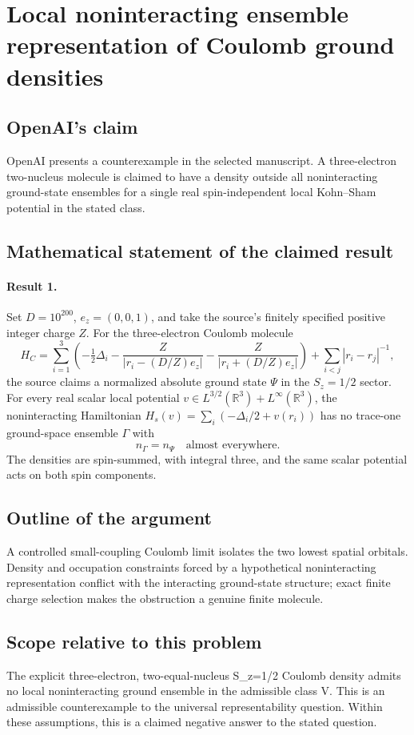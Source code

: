 \documentclass[11pt]{article}
\begin{document}
\section*{Local noninteracting ensemble representation of Coulomb ground densities}

\subsection{OpenAI's claim}
OpenAI presents a counterexample in the selected manuscript. A three-electron two-nucleus molecule is claimed to have a density outside all noninteracting ground-state ensembles for a single real spin-independent local Kohn--Sham potential in the stated class.

\subsection{Mathematical statement of the claimed result}
\paragraph{Result 1.} Set \(D=10^{200}\), \(e_z=(0,0,1)\), and take the source's finitely specified positive integer charge \(Z\). For the three-electron Coulomb molecule
\[
 H_C=\sum_{i=1}^3\left(-\tfrac12\Delta_i-
 \frac Z{|r_i-(D/Z)e_z|}-\frac Z{|r_i+(D/Z)e_z|}\right)
 +\sum_{i<j}|r_i-r_j|^{-1},
\]
the source claims a normalized absolute ground state \(\Psi\) in the \(S_z=1/2\) sector. For every real scalar local potential \(v\in L^{3/2}(\mathbb R^3)+L^\infty(\mathbb R^3)\), the noninteracting Hamiltonian \(H_s(v)=\sum_i(-\Delta_i/2+v(r_i))\) has no trace-one ground-space ensemble \(\Gamma\) with
\[
 n_\Gamma=n_\Psi\quad\text{almost everywhere}.
\]
The densities are spin-summed, with integral three, and the same scalar potential acts on both spin components.

\subsection{Outline of the argument}
A controlled small-coupling Coulomb limit isolates the two lowest spatial orbitals. Density and occupation constraints forced by a hypothetical noninteracting representation conflict with the interacting ground-state structure; exact finite charge selection makes the obstruction a genuine finite molecule.

\subsection{Scope relative to this problem}
The explicit three-electron, two-equal-nucleus S\_z=1/2 Coulomb density admits no local noninteracting ground ensemble in the admissible class V. This is an admissible counterexample to the universal representability question. Within these assumptions, this is a claimed negative answer to the stated question.
\end{document}
